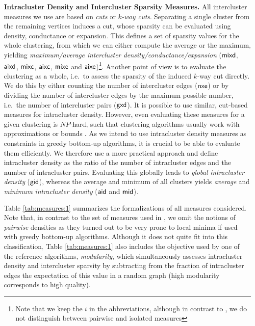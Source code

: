 \documentclass{llncs}
\newcommand{\measure}[1]{\ensuremath{\text{\normalfont{\sffamily {#1}}}}\xspace}
\newcommand{\andreapar}{\vspace*{.5ex}\par\noindent}
\begin{document}
\andreapar\textbf{Intracluster Density and Intercluster Sparsity Measures.}
All intercluster measures we use are based on \emph{cuts} or \emph{$k$-way cuts}. 
Separating a single cluster from the remaining vertices induces a cut, 
whose sparsity can be evaluated using density, conductance or expansion.
This defines a set of sparsity values for the whole clustering, from which we can either compute the average or the maximum, yielding \emph{maximum/average intercluster density/conductance/expansion} (\measure{mixd}, \measure{aixd}, \measure{mixc}, \measure{aixc}, \measure{mixe} and \measure{aixe})\footnote{Note that we keep the $i$ in the abbreviations, although in contrast to \cite{gsw-dcgc-11b}, we do not distinguish between pairwise and isolated measures}.
Another point of view is to evaluate the clustering as a whole, i.e.~to assess the sparsity of the induced $k$-way cut directly.
We do this by either counting the number of intercluster edges (\measure{nxe}) or by dividing the number of intercluster edges by the maximum possible number, i.e.~the number of intercluster pairs (\measure{gxd}).
It is possible to use similar, cut-based measures for intracluster density. 
However, even evaluating these measures for a given clustering is $NP$-hard, such that clustering algorithms usually work with approximations or bounds \cite{kvv-cgds-00,ftt-gcmct-04,bgw-egcme-07}.
As we intend to use intracluster density measures as constraints in greedy bottom-up algorithms, it is crucial to be able to evaluate them efficiently. 
We therefore use a more practical approach and define intracluster density as the ratio of the number of intracluster edges and the number of intracluster pairs. 
Evaluating this globally leads to \emph{global intracluster density} (\measure{gid}), whereas the average and minimum of all clusters yields \emph{average} and \emph{minimum intracluster density} (\measure{aid} and \measure{mid}).
\par
Table \ref{tab:measures:1} summarizes the formalizations of all 
measures considered.
Note that, in contrast to the set of measures used in \cite{gsw-dcgc-11b}, we omit the notions of \emph{pairwise} densities as they turned out to be very prone to local minima if used with greedy bottom-up algorithms.
Although it does not quite fit into this classification, Table \ref{tab:measures:1} also includes the objective used by one of the reference algorithms, \emph{modularity}, which simultaneously assesses intracluster density and intercluster sparsity by subtracting from the fraction of intracluster edges the expectation of this value in a random graph (high modularity corresponds to high quality).
\end{document}
